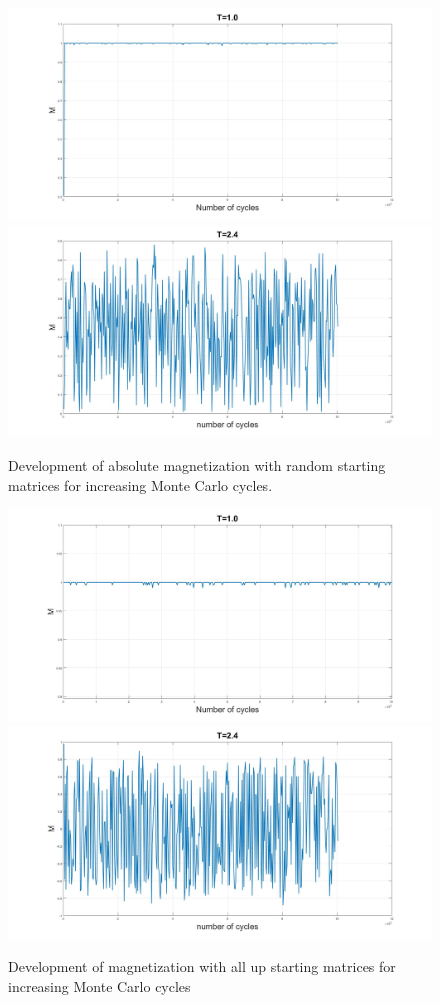 \documentclass[10pt,a4paper]{article}
\begin{document}
\begin{figure} [H]
\centerline{
\includegraphics[scale=0.15]{RANDOMmag1abs.jpg}
\includegraphics[scale=0.15]{RANDOMmag24abs.jpg}
}
\caption{Development of absolute magnetization with random starting matrices for increasing Monte Carlo cycles.}
\label{fig:RandomMagAbs}
\end{figure}


\begin{figure} [H]
\centerline{
\includegraphics[scale=0.15]{UPmag1notabs.jpg}
\includegraphics[scale=0.15]{UPmag24notabs.jpg}
}
\caption{Development of magnetization with all up starting matrices for increasing Monte Carlo cycles}
\label{fig:UpMagNotAbs}
\end{figure}
\end{document}
